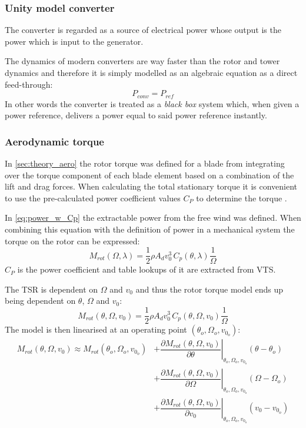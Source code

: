 \subsubsection{Unity model converter} \label{sec:wtLin_conv_unity}
The converter is regarded as a source of electrical power whose output is the power which is input to the generator.

The dynamics of modern converters are way faster than the rotor and tower dynamics and therefore it is simply modelled as an algebraic equation as a direct feed-through:
\begin{equation}\label{eq:wtLin_comp_convdft}
	P_{conv} = P_{ref}
\end{equation}
In other words the converter is treated as a \textit{black box} system which, when given a power reference, delivers a power equal to said power reference instantly.


\subsubsection{Aerodynamic torque} \label{sec:wtLin_aero_torque}
In \cref{sec:theory_aero} the rotor torque was defined for a blade from integrating over the torque component of each blade element based on a combination of the lift and drag forces. When calculating the total stationary torque it is convenient to use the pre-calculated power coefficient values $ C_P $ to determine the torque \cite{Knudsen2013}.

In \cref{eq:power_w_Cp} the extractable power from the free wind was defined. When combining this equation with the definition of power in a mechanical system the torque on the rotor can be expressed:
\begin{equation}\label{eq:wtLin_Mrot_lambda}
	M_{rot}(\Omega, \lambda) = \dfrac{1}{2} \rho A_d v_0^3 \, C_p(\theta, \lambda) \dfrac{1}{\Omega}
\end{equation}
$ C_P $ is the power coefficient and table lookups of it are extracted from VTS.

The TSR is dependent on $ \Omega $ and $ v_0 $ and thus the rotor torque model ends up being dependent on $ \theta $, $ \Omega $ and $ v_0 $:
\begin{equation}\label{eq:wtLin_Mrot_wind}
	M_{rot}(\theta, \Omega, v_0) = \dfrac{1}{2} \rho A_d v_0^3 \, C_p(\theta, \Omega, v_0) \dfrac{1}{\Omega}
\end{equation}
The model is then linearised at an operating point $ (\theta_o, \Omega_o, v_{0_o}) $:
\begin{align}
	M_{rot}(\theta, \Omega, v_0) \approx M_{rot}(\theta_o, \Omega_o, v_{0_o}) 
	& + \left. \dfrac{\partial M_{rot}(\theta, \Omega, v_0)}{\partial \theta} \right |_{\theta_o, \Omega_o, v_{0_o}} ( \theta-\theta_o) \\
	& + \left. \dfrac{\partial M_{rot}(\theta, \Omega, v_0)}{\partial \Omega} \right |_{\theta_o, \Omega_o, v_{0_o}} ( \Omega-\Omega_o) \\
	& + \left. \dfrac{\partial M_{rot}(\theta, \Omega, v_0)}{\partial v_0} \right |_{\theta_o, \Omega_o, v_{0_o}} ( v_0 - v_{0_o})
\end{align}


